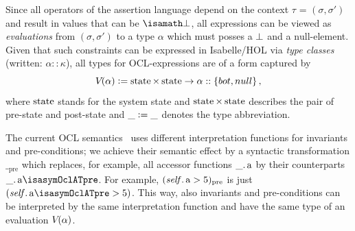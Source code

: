 \isatagannexa
Since all operators of the assertion language depend on the context $\tau$ = $(\sigma,
\sigma')$ and result in values that can be $\isasymbottom$, all expressions can
be viewed as \emph{evaluations} from $(\sigma, \sigma')$ to a type $\alpha$
which must posses a $\bot$ and a $\text{null}$-element. Given that such
constraints can be expressed in Isabelle/HOL via \emph{type classes} (written: $\alpha::\kappa$),
all types for OCL-expressions are of a form captured by
 \begin{equation*}
 \V{}{\alpha} \defeq \state{} \times \state{} \to \alpha::\{bot,null\}  \mi{,}
 \end{equation*}
where $\state{}$ stands for the system state and $\state{} \times
\state{}$ describes the pair of pre-state and post-state and
$\_\mathrel{\mathop:}=\_$ denotes the type abbreviation.

The current OCL semantics~\cite[Annex A]{omg:ocl:2003} uses different
interpretation functions for invariants and pre-conditions; we achieve
their semantic effect by a syntactic transformation $\__\text{pre}$
which replaces, for example, all accessor functions
$\getAttrib{\_}{a}$ by their counterparts
$\getAttrib{\_}{a\isasymOclATpre}$. For example,
$(\getAttrib{\self}{a} > 5)_\text{pre}$ is just
$(\getAttrib{\self}{a\isasymOclATpre} > 5)$. This way, also invariants
and pre-conditions can be interpreted by the same interpretation
function and have the same type of an evaluation $V_{}({\alpha})$.
\endisatagannexa

